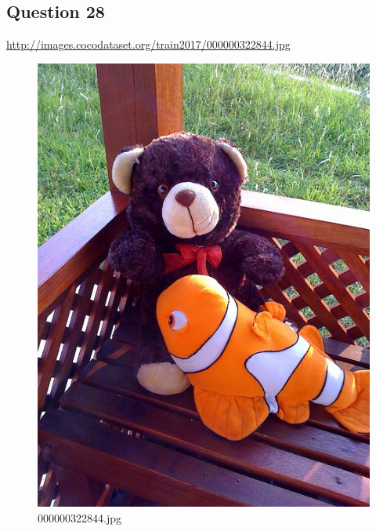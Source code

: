 \subsection*{Question 28}
\url{http://images.cocodataset.org/train2017/000000322844.jpg}
    \begin{figure}[h]
        \centering
        \includegraphics[width=0.8\linewidth]{../image set/easy/000000322844.jpg}
        \caption{000000322844.jpg}
    \end{figure}
